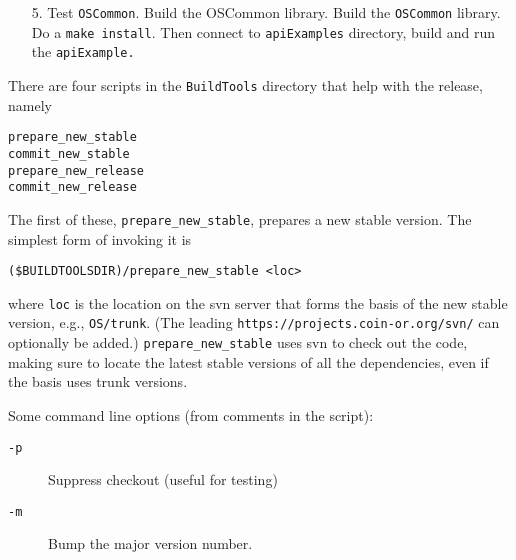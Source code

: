 \begin{itemize}
\begin{itemize}
\begin{verbatim}
OSSolverService  -config ../data/configFiles/testRemoteRetrieve.config
\end{verbatim}
Before executing this command make sure to put your jobID into the file {\tt retrieve.osol }.  Also, either delete the {\tt -browser} option or put in the path to your browser.
The result of the optimization will be put into a file called {\tt test.osrl} that will be in the directory in which you are running the {\tt OSSolverService.} 

\end{itemize}



{\bf IMPORTANT:}  Please do NOT commit the changes to these config files. 


\item[5.] Test {\tt OSCommon}. Build the OSCommon library.  Build the {\tt OSCommon} library.  Do a {\tt make install}.   Then connect to {\tt apiExamples} directory, build and run the {\tt apiExample.}
\end{itemize}


\label{section:ReleasePrep}

There are four scripts in the {\tt BuildTools} directory that help with the release, namely

\begin{verbatim}
prepare_new_stable
commit_new_stable
prepare_new_release
commit_new_release
\end{verbatim}

\medskip

The first of these, {\tt prepare\_new\_stable}, prepares a new stable version. The simplest form of invoking it is

\begin{verbatim}
($BUILDTOOLSDIR)/prepare_new_stable <loc>
\end{verbatim}

where {\tt loc} is the location on the svn server that forms the basis of the new stable version, e.g., {\tt OS/trunk}. (The leading {\tt https://projects.coin-or.org/svn/} can optionally be added.)
{\tt prepare\_new\_stable} uses svn to check out the code, making sure to locate the latest stable versions of all the dependencies, even if the basis uses trunk versions.

Some command line options (from comments in the script):

\begin{description}
  \item[\tt -p]			Suppress checkout (useful for testing)
  \item[\tt -m] 		Bump the major version number.
\end{description}

